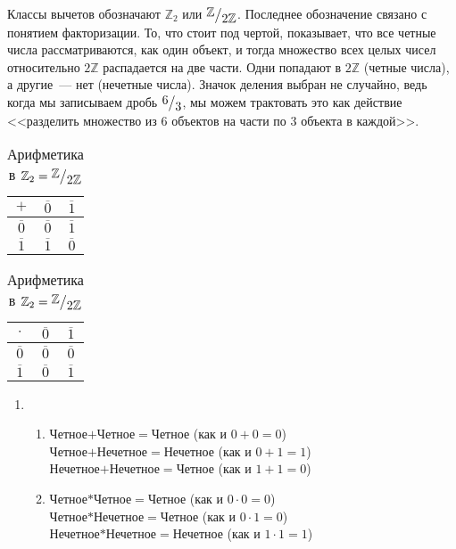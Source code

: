 \documentclass[russian]{lecture-notes}
\newcommand{\frc}[2]{\raisebox{2pt}{$#1$}\big/\raisebox{-3pt}{$#2$}}
\newcommand{\klas}[1]{\overline{#1}}
\begin{document}
Классы вычетов обозначают $\mathbb{Z}_2$ или $\frc{\mathbb{Z}}{2\mathbb{Z}}$. Последнее обозначение связано с понятием факторизации. То, что стоит под чертой, показывает, что все четные числа рассматриваются, как один объект, и тогда множество всех целых чисел относительно $2\mathbb{Z}$ распадается на две части. Одни попадают в $2\mathbb{Z}$ (четные числа), а другие~--- нет (нечетные числа). Значок деления выбран не случайно, ведь когда мы записываем дробь $\frc{6}{3}$, мы можем трактовать это как действие <<разделить множество из $6$ объектов на части по $3$ объекта в каждой>>.

\begin{table}[H]
	\caption{Арифметика в $\mathbb{Z}_2 = \frc{\mathbb{Z}}{2\mathbb{Z}}$}
	\centering
	\label{tab:arif}
	\begin{subtable}[H]{0.49\linewidth}
		\centering
		\label{tab:arif1}
		\begin{tabular}{|c|c|c|}
			\hline
			$+$ & $\klas{0}$ & $\klas{1}$ \\ \hline
			$\klas{0}$ & $\klas{0}$ & $\klas{1}$ \\ \hline
			$\klas{1}$ & $\klas{1}$ & $\klas{0}$ \\ 
			\hline
		\end{tabular}
	\end{subtable}
	\hfill
	\begin{subtable}[H]{0.49\linewidth}
		\centering
		\label{tab:arif2}
		\begin{tabular}{|c|c|c|}
			\hline
			\centering
			\label{tab:arif2}
			$\cdot$ & $\klas{0}$ & $\klas{1}$ \\ \hline
			$\klas{0}$ & $\klas{0}$ & $\klas{0}$ \\ \hline
			$\klas{1}$ & $\klas{0}$ & $\klas{1}$ \\ 
			\hline
		\end{tabular}
	\end{subtable}
\end{table}

\begin{enumerate}
	\item 	\begin{enumerate}
				\item Четное$+$Четное$=$Четное (как и $0 + 0 = 0$) \\
					Четное$+$Нечетное$=$Нечетное (как и $0 + 1 = 1$) \\
					Нечетное$+$Нечетное$=$Четное (как и $1 + 1 = 0$)
				\item Четное$*$Четное$=$Четное (как и $0 \cdot 0 = 0$) \\
				Четное$*$Нечетное$=$Четное (как и $0 \cdot 1 = 0$) \\
				Нечетное$*$Нечетное$=$Нечетное (как и $1 \cdot 1 = 1$)
			\end{enumerate}
\end{enumerate}
\end{document}
